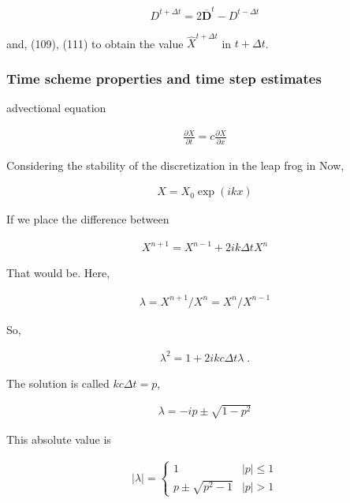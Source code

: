 \begin{eqnarray}
   D^{t+\Delta t} = 2\overline{ {\mathbf{D}} }^{t} - D^{t-\Delta t}
\end{eqnarray}

and, (109), (111) to obtain the value \(\hat{X}^{t+\Delta t}\) in
\(t+\Delta t\).

\hypertarget{time-scheme-properties-and-time-step-estimates}{%
\subsubsection{Time scheme properties and time step
estimates}\label{time-scheme-properties-and-time-step-estimates}}

advectional equation

\begin{eqnarray}
  \frac{\partial{X}}{\partial {t}} = c \frac{\partial{X}}{\partial {x}}
\end{eqnarray}

Considering the stability of the discretization in the leap frog in Now,

\begin{eqnarray}
  X = X_0 \exp(ikx)
\end{eqnarray}

If we place the difference between

\begin{eqnarray}
  X^{n+1} = X^{n-1} + 2 i k \Delta t X^n
\end{eqnarray}

That would be. Here,

\begin{eqnarray}
  \lambda = X^{n+1}/X^n = X^n/X^{n-1} 
\end{eqnarray}

So,

\begin{eqnarray}
  \lambda^2 = 1 + 2 i kc \Delta t \lambda \; .
\end{eqnarray}

The solution is called \(kc \Delta t = p\),

\begin{eqnarray}
 \lambda = -i p \pm \sqrt{1-p^2}
\end{eqnarray}

This absolute value is

\begin{eqnarray}
  |\lambda| = \left\{ 
             \begin{array}{ll}
               1 & |p| \le 1 \\
               p \pm \sqrt{p^2-1} & |p| > 1
             \end{array}
             \right.
\end{eqnarray}

